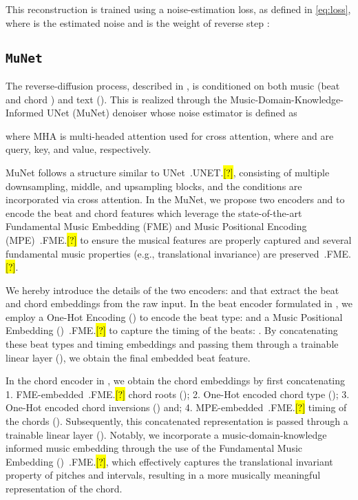 \documentclass[11pt]{article}
\let\realcite\cite
\renewcommand{\cite}[1]{\ifx.#1.\hl{[?]}\else\realcite{#1}\fi}
\begin{document}
This reconstruction is trained using a noise-estimation loss, as defined in \cref{eq:loss}, where  is the estimated noise and  is the weight of reverse step :









\subsection{\texttt{MuNet}}

The reverse-diffusion process, described in , is conditioned on both music (beat  and chord ) and text  (). This is realized through the Music-Domain-Knowledge-Informed UNet (MuNet) denoiser whose noise estimator is defined as 

where MHA is multi-headed attention used for cross attention, where  and  are query, key, and value, respectively. 

MuNet follows a structure similar to UNet~\cite{UNET}, consisting of multiple downsampling, middle, and upsampling blocks, and the conditions are incorporated via cross attention. In the MuNet, we propose two encoders  and  to encode the beat and chord features which leverage the state-of-the-art Fundamental Music Embedding (FME) and Music Positional Encoding (MPE)~\cite{FME} to ensure the musical features are properly captured and several fundamental music properties (e.g., translational invariance) are preserved~\cite{FME}. 

We hereby introduce the details of the two encoders:  and  that extract the beat and chord embeddings from the raw input. In the beat encoder  formulated in , we employ a One-Hot Encoding () to encode the beat type:  and a Music Positional Embedding ()~\cite{FME} to capture the timing of the beats: . By concatenating these beat types and timing embeddings and passing them through a trainable linear layer (), we obtain the final embedded beat feature. 







In the chord encoder in , we obtain the chord embeddings by first concatenating 1. FME-embedded~\cite{FME} chord roots (); 2. One-Hot encoded chord type (); 3. One-Hot encoded chord inversions () and; 4. MPE-embedded~\cite{FME} timing of the chords (). Subsequently, this concatenated representation is passed through a trainable linear layer (). Notably, we incorporate a music-domain-knowledge informed music embedding through the use of the Fundamental Music Embedding ()~\cite{FME}, which effectively captures the translational invariant property of pitches and intervals, resulting in a more musically meaningful representation of the chord. 
\end{document}
